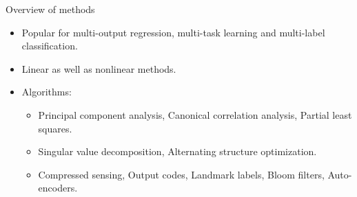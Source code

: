 \documentclass[11pt,compress,t,notes=noshow, xcolor=table]{beamer}
\begin{document}
\begin{frame}{Overview of methods}
	
	\begin{itemize}
		\item Popular for multi-output regression, multi-task learning and multi-label classification.
		\item Linear as well as nonlinear methods.
		\item Algorithms: 
		\begin{itemize}
			\item Principal component analysis, Canonical correlation analysis, Partial least squares.
			\item Singular value decomposition, Alternating structure optimization.
			\item Compressed sensing, Output codes, Landmark labels, Bloom filters, Auto-encoders.
		\end{itemize}
	\end{itemize}
\end{frame}


%
\endlecture
\end{document}
